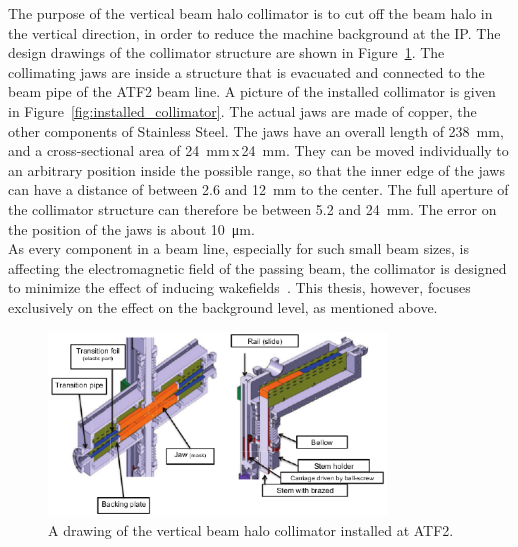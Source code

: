 The purpose of the vertical beam halo collimator is to cut off the beam halo in the vertical direction, in order to reduce the machine background at the IP.
The design drawings of the collimator structure are shown in Figure~\ref{fig:collimator}.
The collimating jaws are inside a structure that is evacuated and connected to the beam pipe of the ATF2 beam line. 
A picture of the installed collimator is given in Figure~\ref{fig:installed_collimator}.
The actual jaws are made of copper, the other components of Stainless Steel. 
The jaws have an overall length of \SI{238}{\milli\meter}, and a cross-sectional area of \mbox{\SI{24}{\milli\meter}\,x\,\SI{24}{\milli\meter}}.
They can be moved individually to an arbitrary position inside the possible range, so that the inner edge of the jaws can have a distance of between 2.6 and \SI{12}{\milli\metre} to the center. 
The full aperture of the collimator structure can therefore be between 5.2 and \SI{24}{\milli\metre}. 
The error on the position of the jaws is about \SI{10}{\micro\metre}.\\
As every component in a beam line, especially for such small beam sizes, is affecting the electromagnetic field of the passing beam, the collimator is designed to minimize the effect of inducing wakefields~\cite{NuriaCollimator2015,Nuria_Thesis}. 
This thesis, however, focuses exclusively on the effect on the background level, as mentioned above.
\begin{figure}
\centering
\includegraphics[width=0.8\textwidth]{Figures/ATF/ATF2_beamhalo_collimator.pdf}
\caption[Drawing of the beam halo collimator]{A drawing of the vertical beam halo collimator installed at ATF2.~\cite{NuriaCollimator2015}}
\label{fig:collimator}
\end{figure}
